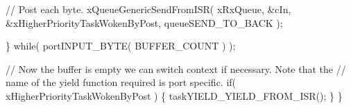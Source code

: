 \begin{DoxyPre}    // Post each byte.
    xQueueGenericSendFromISR( xRxQueue, &cIn, &xHigherPriorityTaskWokenByPost, queueSEND\_TO\_BACK );\end{DoxyPre}



\begin{DoxyPre}   \} while( portINPUT\_BYTE( BUFFER\_COUNT ) );\end{DoxyPre}



\begin{DoxyPre}   // Now the buffer is empty we can switch context if necessary.  Note that the
   // name of the yield function required is port specific.
   if( xHigherPriorityTaskWokenByPost )
   \{
    taskYIELD\_YIELD\_FROM\_ISR();
   \}
\}
\end{DoxyPre}
 